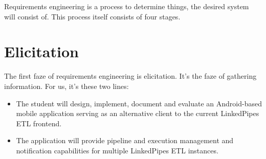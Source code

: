 Requirements engineering is a process to determine things, the desired system will consist of. This process itself consists of four stages.

\section{Elicitation}
The first faze of requirements engineering is elicitation. It's the faze of gathering information.
For us, it's these two lines:
\begin{itemize}
    \item The student will design, implement, document and evaluate an Android-based mobile application serving as an alternative client to the current LinkedPipes ETL frontend.
    \item The application will provide pipeline and execution management and notification capabilities for multiple LinkedPipes ETL instances.
\end{itemize}

